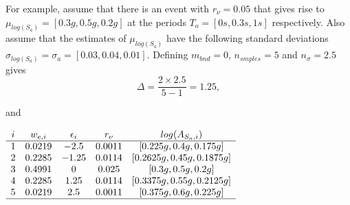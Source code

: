 For example, assume that there is an event with $r_\nu=0.05$ that
gives rise to \mbox{$\mu_{log(S_a)}=[0.3g, 0.5g, 0.2g]$} at the
periods \mbox{$T_o = [0s,0.3s,1s]$} respectively. Also assume that
the estimates of $\mu_{log(S_a)}$ have the following standard
deviations \mbox{$\sigma_{log(S_a)}=\sigma_a = [0.03,0.04,0.01]$}.
Defining $m_{bnd}=0$, $n_{smples}=5$ and $n_\sigma=2.5$ gives
\begin{equation}
\Delta = \frac{2 \times 2.5}{5-1} = 1.25,
\end{equation}

and

\begin{center} $ \begin{array}{ccccc}
i & w_{e,i} & \epsilon_i & r_\nu & log(A_{S_a,i}) \\
\hline
1 & 0.0219 & -2.5 & 0.0011 & [0.225g, 0.4g, 0.175g] \\
2 & 0.2285 & -1.25 & 0.0114 & [0.2625g, 0.45g, 0.1875g] \\
3 & 0.4991 & 0 & 0.025 & [0.3g, 0.5g, 0.2g] \\
4 & 0.2285 & 1.25 & 0.0114 & [0.3375g, 0.55g, 0.2125g] \\
5 & 0.0219 & 2.5 & 0.0011 & [0.375g, 0.6g, 0.225g] \\
\hline
\end{array}$
\end{center}

